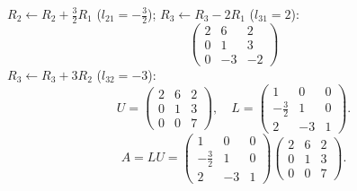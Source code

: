 \documentclass[12pt,a3paper]{article}
\begin{document}
\begin{tcolorbox}[enhanced,breakable,
  colback=cB!4,colframe=cB,boxrule=0.8pt,arc=5pt,
  title={\textbf{Answer --- LU Decomposition of $A=\begin{pmatrix}2&6&2\\-3&-8&0\\4&9&2\end{pmatrix}$}},
  fonttitle=\bfseries\color{white},colbacktitle=cB]

$R_2\leftarrow R_2+\frac{3}{2}R_1$ ($l_{21}=-\frac{3}{2}$); $R_3\leftarrow R_3-2R_1$ ($l_{31}=2$):
\[
\begin{pmatrix}2&6&2\\0&1&3\\0&-3&-2\end{pmatrix}
\]
$R_3\leftarrow R_3+3R_2$ ($l_{32}=-3$):
\[
U=\begin{pmatrix}2&6&2\\0&1&3\\0&0&7\end{pmatrix},\quad
L=\begin{pmatrix}1&0&0\\-\frac{3}{2}&1&0\\2&-3&1\end{pmatrix}.
\]
\[
\boxed{A=LU=\begin{pmatrix}1&0&0\\-\frac{3}{2}&1&0\\2&-3&1\end{pmatrix}\begin{pmatrix}2&6&2\\0&1&3\\0&0&7\end{pmatrix}.}
\]

\end{tcolorbox}
\end{document}
